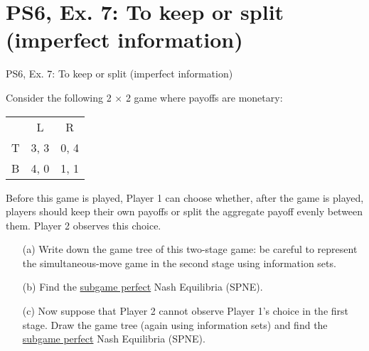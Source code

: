 \section{PS6, Ex. 7: To keep or split (imperfect information)}

\begin{frame}{PS6, Ex. 7: To keep or split (imperfect information)}
  \begin{multicols}{2}
    Consider the following 2 × 2 game where payoffs are monetary:
    \begin{table}
      \begin{tabular}{l|c|c|}
          \multicolumn{1}{c}{} & \multicolumn{1}{c}{L} & \multicolumn{1}{c}{R} \\\cline{2-3}
          T & 3, 3 & 0, 4 \\\cline{2-3}
          B & 4, 0 & 1, 1 \\\cline{2-3}
      \end{tabular}
    \end{table}
    Before this game is played, Player 1 can choose whether, after the game is played, players should keep their own payoffs or split the aggregate payoff evenly between them. Player 2 observes this choice.
  \vfill\null \columnbreak
    \begin{itemize}
      \item[(a)] Write down the game tree of this two-stage game: be careful to represent the simultaneous-move game in the second stage using information sets.
      \item[(b)] Find the \underline{subgame perfect} Nash Equilibria (SPNE).
      \item[(c)] Now suppose that Player 2 cannot observe Player 1’s choice in the first stage. Draw the game tree (again using information sets) and find the \underline{subgame perfect} Nash Equilibria (SPNE).
    \end{itemize}
  \vfill\null
  \end{multicols}
\end{frame}


